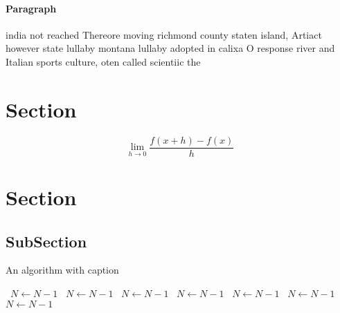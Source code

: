 \documentclass[a4paper]{article}
\begin{document}
\paragraph{Paragraph}
india not reached Thereore moving richmond county staten island, Artiact however state lullaby montana lullaby adopted in calixa O response river and Italian sports culture, oten called scientiic the


\section{Section}

\[\lim_{h \rightarrow 0 } \frac{f(x+h)-f(x)}{h}\]

\section{Section}

\subsection{SubSection}

\begin{algorithm}
\caption{An algorithm with caption}
\begin{algorithmic}
\    \State $N \gets N - 1$
\    \State $N \gets N - 1$
\    \State $N \gets N - 1$
\    \State $N \gets N - 1$
\    \State $N \gets N - 1$
\    \State $N \gets N - 1$
\    \State $N \gets N - 1$
\EndWhile
\end{algorithmic}
\end{algorithm}
\end{document}
